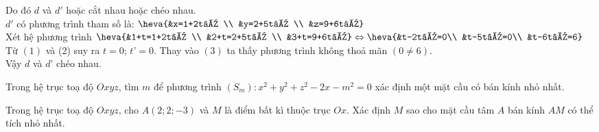 \begin{vd}
{\begin{enumerate}
			Do đó $d$ và $d'$ hoặc cắt nhau hoặc chéo nhau.\\
			${d}'$ có phương trình tham số là:
			$\heva{&x=1+2t’ \\
				&y=2+5t’ \\
				&z=9+6t’}$\\
			Xét hệ phương trình $\heva{&1+t=1+2t’ \\
				&2+t=2+5t’ \\
				&3+t=9+6t’}
				\Leftrightarrow \heva{&t-2t’=0\\
					&t-5t’=0\\
					&t-6t’=6}$\\
			Từ $(1)$ và (2) suy ra $t=0$; $t’=0$. Thay vào $(3)$ ta thấy phương trình không thoả mãn $\left( 0\ne 6 \right)$.\\
			Vậy $d$ và $d’$ chéo nhau.
		\end{enumerate}
	}
\end{vd}

\begin{vd}[NB]%
	Trong hệ trục toạ độ $Oxyz$, tìm $m$ để phương trình $(S_m) \colon x^2+y^2+z^2-2x-m^2 = 0$ xác định một mặt cầu có bán kính nhỏ nhất.
\end{vd}

\begin{vd}[TH]%
	Trong hệ trục toạ độ $Oxyz$, cho $A(2;2;-3)$ và $M$ là điểm bất kì thuộc trục $Ox$. Xác định $M$ sao cho mặt cầu tâm $A$ bán kính $AM$ có thể tích nhỏ nhất.
\end{vd}

